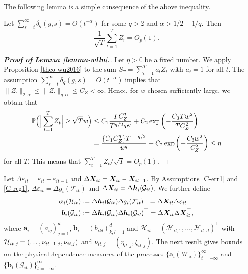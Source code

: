 The following lemma is a simple consequence of the above inequality. 


\begin{lemmaA}\label{lemma-wlln}
Let $\sum_{s=t}^\infty \delta_{q}(g,s) = O(t^{-\alpha})$ for some $q > 2$ and $\alpha > 1/2 - 1/q$. Then 
\[ \frac{1}{\sqrt{T}} \sum_{t=1}^T Z_t = O_p(1). \]
\end{lemmaA} 


\begin{proof}[\textnormal{\textbf{Proof of Lemma \ref{lemma-wlln}.}}]
Let $\eta > 0$ be a fixed number. We apply Proposition \ref{theo-wu2016} to the sum $S_T = \sum_{t=1}^T a_t Z_t$ with $a_t = 1$ for all $t$. The assumption $\sum_{s=t}^\infty \delta_{q}(g,s) = O(t^{-\alpha})$ implies that $\|Z.\|_{2, \alpha} \le \|Z.\|_{q, \alpha} \le C_Z < \infty$. Hence, for $w$ chosen sufficiently large, we obtain that
\begin{align*}
\mathbb{P}\Big( \Big| \sum_{t=1}^T Z_t \Big| \geq \sqrt{T} w\Big) 
 & \leq C_1 \frac{T C_Z^q}{T^{q/2} w^q} + C_2 \exp \left( - \frac{C_3 T w^2} {T C_Z^2}\right) \\
 & = \frac{\{C_1 C_Z^q\} T^{1-q/2}}{w^q} + C_2 \exp \left( - \frac{C_3 w^2} {C_Z^2}\right) \le \eta
\end{align*}
for all $T$. This means that $\sum_{t=1}^T Z_t / \sqrt{T} = O_p(1)$. 
\end{proof}


Let $\Delta \varepsilon_{it} = \varepsilon_{it} - \varepsilon_{it-1}$ and $\Delta \boldsymbol{X}_{it} = \boldsymbol{X}_{it} - \boldsymbol{X}_{it-1}$. By Assumptions \ref{C-err1} and \ref{C-reg1}, $\Delta \varepsilon_{it} = \Delta g_i(\mathcal{F}_{it})$ and $\Delta \boldsymbol{X}_{it} = \Delta \boldsymbol{h}_{i}(\mathcal{G}_{it})$. We further define
\begin{align*}
\boldsymbol{a}_{i}(\mathcal{H}_{it}) & := \Delta \boldsymbol{h}_{i}(\mathcal{G}_{it}) \Delta g_i(\mathcal{F}_{it})\phantom{^\top} = \Delta \boldsymbol{X}_{it} \Delta \varepsilon_{it} \\
\boldsymbol{b}_{i}(\mathcal{G}_{it}) & := \Delta \boldsymbol{h}_{i}(\mathcal{G}_{it}) \Delta \boldsymbol{h}_{i}(\mathcal{G}_{it})^\top = \Delta \boldsymbol{X}_{it} \Delta \boldsymbol{X}_{it}^\top,
\end{align*}
where $\boldsymbol{a}_i = (a_{ij})_{j=1}^d$, $\boldsymbol{b}_i = (b_{ikl})_{k,l=1}^d$ and $\mathcal{H}_{it} = (\mathcal{H}_{it,1},\ldots,\mathcal{H}_{it,d})^\top$ with $\mathcal{H}_{it,j} = (\ldots, \nu_{it-1,j},\linebreak \nu_{it,j})$ and $\nu_{it,j} = (\eta_{it,j},\xi_{it,j})$. The next result gives bounds on the physical dependence measures of the processes $\{ \boldsymbol{a}_{i}(\mathcal{H}_{it}) \}_{t=-\infty}^\infty$ and $\{ \boldsymbol{b}_{i}(\mathcal{G}_{it}) \}_{t=-\infty}^\infty$. 


